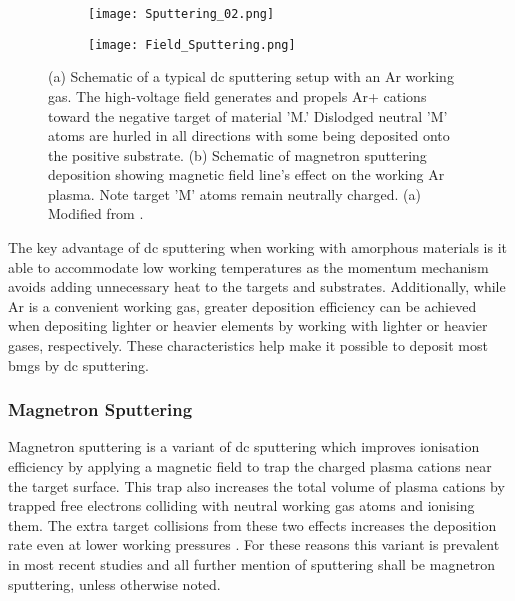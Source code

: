 \documentclass[a4paper,12pt,oneside]{report}%
\begin{document}
\begin{figure}[bp]
	\centering
	\begin{subfigure}[htbp]{0.75\textwidth}
		\texttt{[image: Sputtering\_02.png]}
		\caption{}
		\label{fig:Sputter_Schematic}
	\end{subfigure}
	\begin{subfigure}[htbp]{0.75\textwidth}
		\texttt{[image: Field\_Sputtering.png]}
		\caption{}
		\label{fig:Field_Sputtering}
	\end{subfigure}
	\caption[(a) Schematic of a typical \acrshort{dc} sputtering setup with an Ar working gas. The high-voltage field generates and propels Ar+ cations toward the negative target of material 'M.' Dislodged neutral 'M' atoms are hurled in all directions with some being deposited onto the positive substrate. (b) Schematic of magnetron sputtering deposition showing magnetic field line's effect on the working Ar plasma. Note target 'M' atoms remain neutrally charged.]{(a) Schematic of a typical \acrshort{dc} sputtering setup with an Ar working gas. The high-voltage field generates and propels Ar+ cations toward the negative target of material 'M.' Dislodged neutral 'M' atoms are hurled in all directions with some being deposited onto the positive substrate. (b) Schematic of magnetron sputtering deposition showing magnetic field line's effect on the working Ar plasma. Note target 'M' atoms remain neutrally charged. (a) Modified from \cite{Brown2014}.}%
	\label{fig:Sputter}
\end{figure}

The key advantage of \gls{dc} sputtering when working with amorphous materials is it able to accommodate low working temperatures as the momentum mechanism avoids adding unnecessary heat to the targets and substrates. Additionally, while Ar is a convenient working gas, greater deposition efficiency can be achieved when depositing lighter or heavier elements by working with lighter or heavier gases, respectively. These characteristics help make it possible to deposit most \glspl{bmg} by \gls{dc} sputtering. 

\subsubsection{Magnetron Sputtering}
Magnetron sputtering is a variant of \gls{dc} sputtering which improves ionisation efficiency by applying a magnetic field to trap the charged plasma cations near the target surface. This trap also increases the total volume of plasma cations by trapped free electrons colliding with neutral working gas atoms and ionising them. The extra target collisions from these two effects increases the deposition rate even at lower working pressures . For these reasons this variant is prevalent in most recent studies and all further mention of sputtering shall be magnetron sputtering, unless otherwise noted. 
\end{document}
